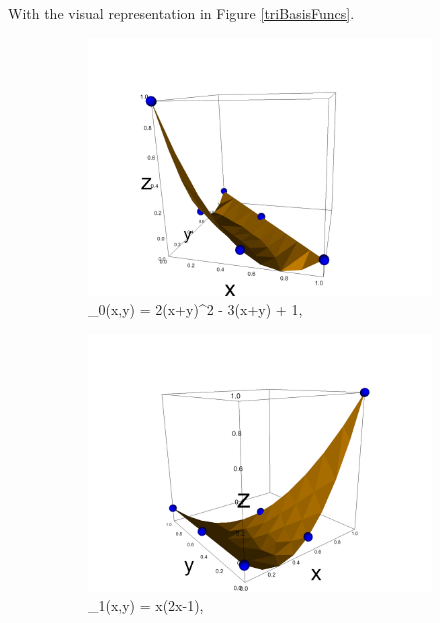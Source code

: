 \documentclass[12pt,a4paper]{article}
\begin{document}
With the visual representation in Figure \ref{triBasisFuncs}.
\begin{figure}[H]
 \begin{subfigure}{0.5\textwidth}
     \includegraphics[width=\textwidth]{Pics/BasisFunc/triBasis0.png}
     \caption{\phi_0(x,y) = 2(x+y)^2 - 3(x+y) + 1,}
 \end{subfigure}
 \hfill
 \begin{subfigure}{0.5\textwidth}
     \includegraphics[width=\textwidth]{Pics/BasisFunc/triBasis1.png}
     \caption{\phi_1(x,y) = x(2x-1),}
 \end{subfigure}
 \hfill
 \begin{subfigure}{0.5\textwidth}

\end{subfigure}
\end{figure}
\end{document}
